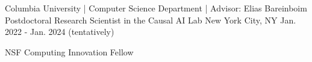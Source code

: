 \begin{cventries}
     \cventry
    {Columbia University | Computer Science Department | Advisor: Elias Bareinboim} %
    {Postdoctoral Research Scientist in the Causal AI Lab} %
    {New York City, NY} %
    {Jan. 2022 - Jan. 2024 (tentatively)} %
    {
      \begin{cvitems} %
        \item {NSF Computing Innovation Fellow}
      \end{cvitems}
    }
    \vspace{-0.15cm}
\end{cventries}

